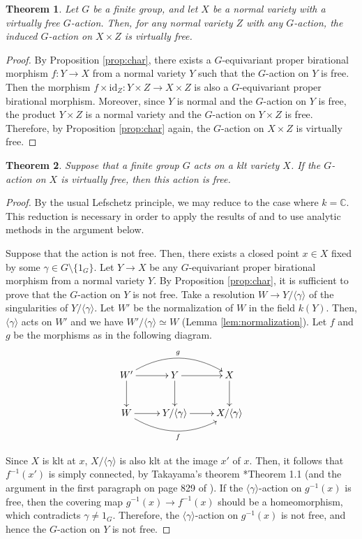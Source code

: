 \documentclass[a4paper,11pt]{amsart}
\newtheorem{thm}{Theorem}[section]
\theoremstyle{definition}
\theoremstyle{remark}
\begin{document}
\begin{thm}\label{thm:prod}
Let $G$ be a finite group, and let $X$ be a normal variety with a virtually free $G$-action. 
Then, for any normal variety $Z$ with any $G$-action, the induced $G$-action on $X \times Z$ is virtually free. 
\end{thm}
\begin{proof}
By Proposition \ref{prop:char}, there exists a $G$-equivariant proper birational morphism $f: Y \to X$ from a normal variety $Y$ such that the $G$-action on $Y$ is free.
Then the morphism $f \times \mathrm{id}_Z: Y \times Z \to X \times Z$ is also a $G$-equivariant proper birational morphism. 
Moreover, since $Y$ is normal and the $G$-action on $Y$ is free, 
the product $Y \times Z$ is a normal variety and the $G$-action on $Y \times Z$ is free.
Therefore, by Proposition \ref{prop:char} again, the $G$-action on $X \times Z$ is virtually free.
\end{proof}


\begin{thm}\label{thm:kltcase}
Suppose that a finite group $G$ acts on a klt variety $X$.
If the $G$-action on $X$ is virtually free, then this action is free. 
\end{thm}
\begin{proof}
By the usual Lefschetz principle, we may reduce to the case where $k = \mathbb{C}$. 
This reduction is necessary in order to apply the results of \cite{Tak03} and to use analytic methods in the argument below. 

Suppose that the action is not free. 
Then, there exists a closed point $x \in X$ fixed by some $\gamma \in G \setminus \{ 1_G \}$. 
Let $Y \to X$ be any $G$-equivariant proper birational morphism from a normal variety $Y$. 
By Proposition \ref{prop:char}, it is sufficient to prove that the $G$-action on $Y$ is not free. 
Take a resolution $W \to Y/ \langle \gamma \rangle$ of the singularities of $Y/ \langle \gamma \rangle$.  
Let $W'$ be the normalization of $W$ in the field $k(Y)$. Then, $\langle \gamma \rangle$ acts on $W'$ and we have $W'/\langle \gamma \rangle \simeq W$ (Lemma \ref{lem:normalization}). 
Let $f$ and $g$ be the morphisms as in the following diagram. 
\[
\xymatrix{
W' \ar[r] \ar[d] \ar@/^18pt/[rr]^g & Y \ar[r] \ar[d] & X \ar[d] \\
W \ar[r] \ar@/_18pt/[rr]_f & Y/\langle \gamma \rangle \ar[r] & X/\langle \gamma \rangle
}
\]

Since $X$ is klt at $x$, $X/\langle \gamma \rangle$ is also klt at the image $x'$ of $x$. 
Then, it follows that $f^{-1}(x')$ is simply connected, by Takayama's theorem \cite{Tak03}*{Theorem 1.1} 
(and the argument in the first paragraph on page 829 of \cite{Tak03}). 
If the $\langle \gamma \rangle$-action on $g^{-1}(x)$ is free, 
then the covering map $g^{-1}(x) \to f^{-1}(x)$ should be a homeomorphism, which contradicts $\gamma \not = 1 _G$. 
Therefore, the $\langle \gamma \rangle$-action on $g^{-1}(x)$ is not free, and hence the $G$-action on $Y$ is not free. 
\end{proof}
\end{document}
